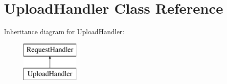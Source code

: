 \hypertarget{classmain_1_1_upload_handler}{\section{Upload\-Handler Class Reference}
\label{classmain_1_1_upload_handler}
}
Inheritance diagram for Upload\-Handler\-:\begin{figure}[H]
\begin{center}
\leavevmode
\includegraphics[height=2.000000cm]{classmain_1_1_upload_handler}
\end{center}
\end{figure}
